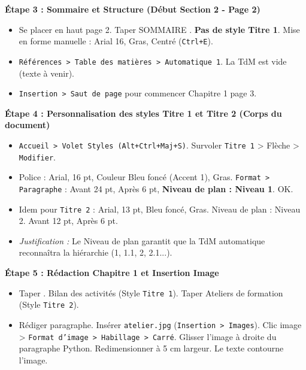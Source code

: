 \documentclass[11pt]{article}
\newcommand{\cle}[1]{{\popxbold\color{popdark}#1}}
\begin{document}
\begin{exoresolu}
\textbf{Étape 3 : Sommaire et Structure (Début Section 2 - Page 2)}
\begin{itemize}
    \item Se placer en haut page 2. Taper \og SOMMAIRE \fg. \textbf{Pas de style Titre 1}. Mise en forme manuelle : Arial 16, Gras, Centré (\texttt{Ctrl+E}).
    \item \texttt{Références > Table des matières > Automatique 1}. La TdM est vide (texte à venir).
    \item \texttt{Insertion > Saut de page} pour commencer Chapitre 1 page 3.
\end{itemize}

\textbf{Étape 4 : Personnalisation des styles Titre 1 et Titre 2 (Corps du document)}
\begin{itemize}
    \item \texttt{Accueil > Volet Styles (Alt+Ctrl+Maj+S)}. Survoler \texttt{Titre 1} > Flèche > \texttt{Modifier}.
    \item Police : Arial, 16 pt, Couleur Bleu foncé (Accent 1), Gras. \texttt{Format > Paragraphe} : Avant 24 pt, Après 6 pt, \textbf{Niveau de plan : Niveau 1}. OK.
    \item Idem pour \texttt{Titre 2} : Arial, 13 pt, Bleu foncé, Gras. Niveau de plan : Niveau 2. Avant 12 pt, Après 6 pt.
    \item \emph{Justification :} Le \cle{Niveau de plan} garantit que la TdM automatique reconnaîtra la hiérarchie (1, 1.1, 2, 2.1...).
\end{itemize}

\textbf{Étape 5 : Rédaction Chapitre 1 et Insertion Image}
\begin{itemize}
    \item Taper . Bilan des activités \fg (Style \texttt{Titre 1}). Taper  Ateliers de formation \fg (Style \texttt{Titre 2}).
    \item Rédiger paragraphe. Insérer \texttt{atelier.jpg} (\texttt{Insertion > Images}). Clic image > \texttt{Format d'image > Habillage > Carré}. Glisser l'image à droite du paragraphe Python. Redimensionner à 5 cm largeur. Le texte contourne l'image.
\end{itemize}


\end{exoresolu}
\end{document}

